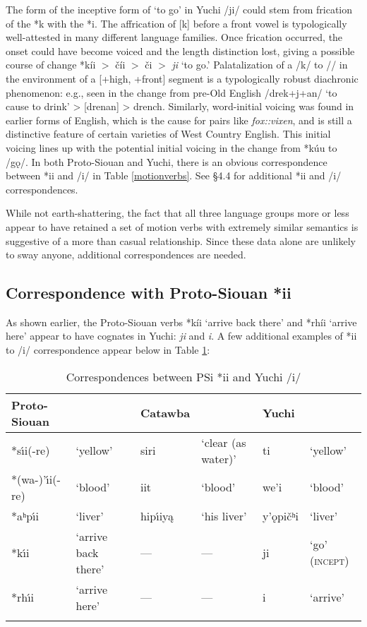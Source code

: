 \documentclass[output=paper]{LSP/langsci}
\begin{document}
{The form of the inceptive form of `to go' in Yuchi /ji/ could stem from frication of the *k with the *i. The affrication of [k] before a front vowel is typologically well-attested in many different language families. Once frication occurred, the onset could have become voiced and the length distinction lost, giving a possible course of change *k\'ii $>$ {\v{c}}\'ii $>$ {\v{c}}i $>$ \emph{ji} `to go.' Palatalization of a /k/ to // in the environment of a [+high, +front] segment is a typologically robust diachronic phenomenon: e.g., seen in the change from pre-Old English /drek+j+an/ `to cause to drink' > [drenan] > drench. Similarly, word-initial voicing was found in earlier forms of English, which is the cause for pairs like \textit{fox::vixen}, and is still a distinctive feature of certain varieties of West Country English. This initial voicing lines up with the potential initial voicing in the change from *k\'uu to /g\k{o}/. In both Proto-Siouan and Yuchi, there is an obvious correspondence between *ii and /i/ in Table \ref{motionverbs}. See \S4.4 for additional *ii and /i/ correspondences.

While not earth-shattering, the fact that all three language groups more or less appear to have retained a set of motion verbs with extremely similar semantics is suggestive of a more than casual relationship. Since these data alone are unlikely to sway anyone, additional correspondences are needed.

\subsection{Correspondence with Proto-Siouan *ii}

As shown earlier, the Proto-Siouan verbs *k\'ii `arrive back there' and *rh\'ii `arrive here' appear to have cognates in Yuchi: \emph{ji} and \emph{\textbeltl i}. A few additional examples of *ii to /i/ correspondence appear below in Table \ref{*ii}:

\begin{table}[h]
\footnotesize
\centering
\caption{Correspondences between PSi *ii and Yuchi /i/}\label{*ii}
	\begin{tabular}{llllll}\lsptoprule
	Proto-Siouan 			&	~	&	Catawba	&	~			&	Yuchi		&	~	\\
\midrule
	*s\'\i i(-re)				&	`yellow'	&	siri		&	`clear (as water)'	&	ti			&	`yellow'\\
	*(wa-)'\'\i i(-re)	&	`blood'		&	iit		&	`blood'					&	we'i		&	`blood'\\ 
	*aʰp\'\i i				&	`liver'		&	hip\'\i iy\k{a}		&	`his liver'					&	y'\k{o}pi\v{c}{ʰ}i		&	`liver'\\ 
	*k\'\i i & `arrive back there' & --- & --- & ji & `go' (\textsc{incept})\\
	*rh\'\i i & `arrive here' & --- & --- & \textbeltl i    & `arrive'  \\
\lspbottomrule	\end{tabular}
\end{table}

}
\end{document}
